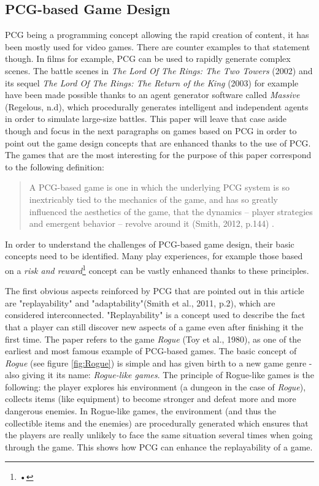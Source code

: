 \subsection{PCG-based Game Design}
PCG being a programming concept allowing the rapid creation of content, it has been mostly used for video games. There are counter examples to that statement though. In films for example, PCG can be used to rapidly generate complex scenes. The battle scenes in \textit{The Lord Of The Rings: The Two Towers} (2002)\cite{film:lotr2} and its sequel \textit{The Lord Of The Rings: The Return of the King} (2003)\cite{film:lotr3} for example have been made possible thanks to an agent generator software called \textit{Massive} (Regelous, n.d)\cite{soft:massive}, which procedurally generates intelligent and independent agents in order to simulate large-size battles. This paper will leave that case aside though and focus in the next paragraphs on games based on PCG in order to point out the game design concepts that are enhanced thanks to the use of PCG. The games that are the most interesting for the purpose of this paper correspond to the following definition:

\begin{quotation}
A PCG-based game is one in which the underlying PCG system is so inextricably tied to the mechanics of the game, and has so greatly influenced the aesthetics of the game, that the dynamics – player strategies and emergent behavior – revolve around it (Smith, 2012, p.144) \cite{pdf:smith}.
\end{quotation}

In order to understand the challenges of PCG-based game design, their basic concepts need to be identified. Many play experiences, for example those based on a \textit{risk and reward}\footnote{•} concept can be vastly enhanced thanks to these principles. 

The first obvious aspects reinforced by PCG that are pointed out in this article are "replayability" and "adaptability"(Smith et al., 2011, p.2)\cite{pdf:pcgbased}, which are considered interconnected. "Replayability" is a concept used to describe the fact that a player can still discover new aspects of a game even after finishing it the first time. The paper refers to the game \textit{Rogue} (Toy et al., 1980)\cite{game:rogue}, as one of the earliest and most famous example of PCG-based games. The basic concept of \textit{Rogue} (see figure \ref{fig:Rogue}) is simple and has given birth to a new game genre - also giving it its name: \textit{Rogue-like games}. The principle of Rogue-like games is the following: the player explores his environment (a dungeon in the case of \textit{Rogue}), collects items (like equipment) to become stronger and defeat more and more dangerous enemies. In Rogue-like games, the environment (and thus the collectible items and the enemies) are procedurally generated which ensures that the players are really unlikely to face the same situation several times when going through the game. This shows how PCG can enhance the replayability of a game.

